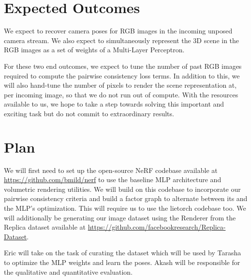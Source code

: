 \documentclass[15pt,letterpaper]{article}
\begin{document}
\section{Expected Outcomes}%
\label{sec:Expected Outcomes}
We expect to recover camera poses for RGB images in the incoming unposed camera stream. We also expect to simultaneously represent the 3D scene in the RGB images as a set of weights of a Multi-Layer Perceptron.

For these two end outcomes, we expect to tune the number of past RGB images required to compute the pairwise consistency loss terms. In addition to this, we will also hand-tune the number of pixels to render the scene representation at, per incoming image, so that we do not run out of compute. With the resources available to us, we hope to take a step towards solving this important and exciting task but do not commit to extraordinary results.
\section{Plan}%
\label{sec:Plan}

We will first need to set up the open-source NeRF codebase available at \hyperlink{https://github.com/bmild/nerf}{https://github.com/bmild/nerf} to use the baseline MLP architecture and volumetric rendering utilities. We will build on this codebase to incorporate our pairwise consistency criteria and build a factor graph to alternate between its and the MLP's optimization. This will require us to use the lietorch codebase too. We will additionally be generating our image dataset using the Renderer from the Replica dataset available at \hyperlink{https://github.com/facebookresearch/Replica-Dataset}{https://github.com/facebookresearch/Replica-Dataset}.

Eric will take on the task of curating the dataset which will be used by Tarasha to optimize the MLP weights and learn the poses. Akash will be responsible for the qualitative and quantitative evaluation.

\footnotesize



\end{document}
